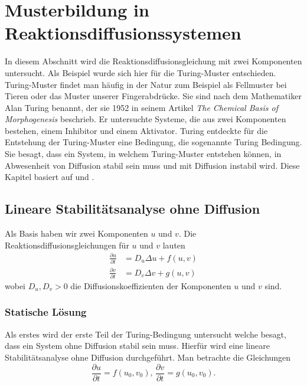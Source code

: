 %
%
%
%
\section{Musterbildung in Reaktionsdiffusionssystemen
\label{reaktdiff:section:teil1}}

In diesem Abschnitt wird die Reaktionsdiffusionsgleichung mit zwei Komponenten untersucht.
Als Beispiel wurde sich hier für die Turing-Muster entschieden.
Turing-Muster findet man häufig in der Natur zum Beispiel als Fellmuster bei Tieren oder  das Muster unserer Fingerabdrücke.
Sie sind nach dem Mathematiker Alan Turing benannt, der sie 1952 in seinem Artikel \textit{The Chemical Basis of Morphogenesis} \cite{turing1952chemical} beschrieb.
Er untersuchte Systeme, die aus zwei Komponenten bestehen, einem Inhibitor und einem Aktivator.
Turing entdeckte für die Entstehung der Turing-Muster eine Bedingung, die sogenannte Turing Bedingung.
Sie besagt, dass ein System, in welchem Turing-Muster entstehen können, in Abwesenheit von Diffusion stabil sein muss und mit Diffusion instabil wird.
Diese Kapitel basiert auf \cite{reaktdiff:turing_patterns_2019} und \cite{reaktdiff:hoyle2006pattern}.

\subsection{Lineare Stabilitätsanalyse ohne Diffusion
\label{reaktdiff:subsection:mathe}}
Als Basis haben wir zwei Komponenten \(u\) und \(v\).
Die Reaktionsdiffusionsgleichungen für \(u\) und \(v\) lauten
\begin{align*}
    \frac{\partial u}{\partial t} &= D_u \Delta u + f(u,v)\\
    \label{reaktdiff:equation:reaktdiff2}
    \frac{\partial v}{\partial t} &= D_v \Delta v + g(u,v)
\end{align*}
wobei \(D_u, D_v > 0\) die Diffusionskoeffizienten der Komponenten \(u\) und \(v\) sind.

\subsubsection{Statische Lösung}
Als erstes wird der erste Teil der Turing-Bedingung untersucht welche besagt, dass ein System ohne Diffusion stabil sein muss.
Hierfür wird eine lineare Stabilitätsanalyse ohne Diffusion durchgeführt.
Man betrachte die Gleichungen
\begin{equation}
    \label{reaktdiff:equation:reaktdiff2ohneDiff}
    \frac{\partial u}{\partial t} = f(u_0,v_0),\,
    \frac{\partial v}{\partial t} = g(u_0,v_0).
\end{equation}

